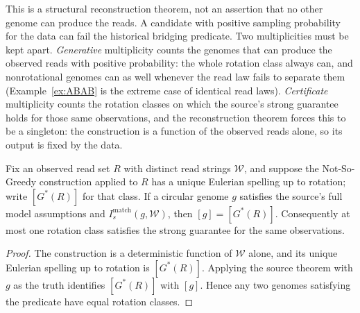 This is a structural reconstruction theorem, not an assertion that no other
genome can produce the reads. A candidate with positive sampling probability
for the data can fail the historical bridging predicate. Two multiplicities
must be kept apart. \emph{Generative} multiplicity counts the genomes that can
produce the observed reads with positive probability: the whole rotation class
always can, and nonrotational genomes can as well whenever the read law fails
to separate them (Example~\ref{ex:ABAB} is the extreme case of identical read
laws). \emph{Certificate} multiplicity counts the rotation classes on which the
source's strong guarantee holds for those same observations, and the
reconstruction theorem forces this to be a singleton: the construction is a
function of the observed reads alone, so its output is fixed by the data.

\begin{proposition}
\label{prop:strong-guarantee-singleton}
Fix an observed read set $R$ with distinct read strings $\mathcal W$, and
suppose the Not-So-Greedy construction applied to $R$ has a unique Eulerian
spelling up to rotation; write $[G^\ast(R)]$ for that class. If a circular
genome $g$ satisfies the source's full model assumptions and
$I_s^{\mathrm{match}}(g,\mathcal W)$, then $[g]=[G^\ast(R)]$. Consequently at
most one rotation class satisfies the strong guarantee for the same
observations.
\end{proposition}
\begin{proof}
The construction is a deterministic function of $\mathcal W$ alone, and its
unique Eulerian spelling up to rotation is $[G^\ast(R)]$. Applying the source
theorem with $g$ as the truth identifies $[G^\ast(R)]$ with $[g]$. Hence any
two genomes satisfying the predicate have equal rotation classes.
\end{proof}


